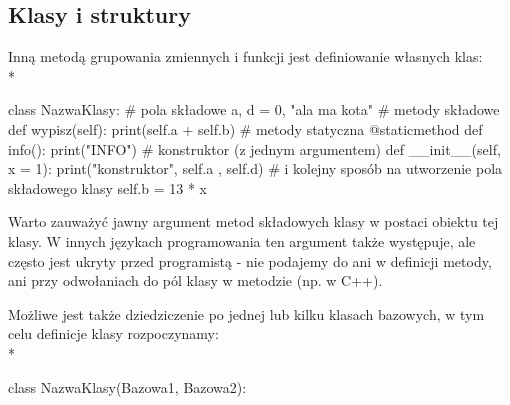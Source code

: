 % 
% 
% 
% 

\subsection{Klasy i struktury }

Inną metodą grupowania zmiennych i funkcji jest definiowanie własnych klas:
\\*
\begin{CodeFrame*}[python]{}
class NazwaKlasy:
  # pola składowe
  a, d = 0, "ala ma kota"
  # metody składowe
  def wypisz(self):
    print(self.a + self.b)
  # metody statyczna
  @staticmethod
  def info():
    print("INFO")
  # konstruktor (z jednym argumentem)
  def __init__(self, x = 1):
    print("konstruktor", self.a , self.d)
    # i kolejny sposób na utworzenie pola składowego klasy
    self.b = 13 * x
\end{CodeFrame*}

Warto zauważyć jawny argument metod składowych klasy w postaci obiektu tej klasy.
W innych językach programowania ten argument także występuje, ale często jest ukryty przed programistą - nie podajemy do ani w definicji metody, ani przy odwołaniach do pól klasy w metodzie (np. w C++).

Możliwe jest także dziedziczenie po jednej lub kilku klasach bazowych, w tym celu definicje klasy rozpoczynamy:
\\*
\begin{CodeFrame*}[python]{}
class NazwaKlasy(Bazowa1, Bazowa2):
\end{CodeFrame*}

